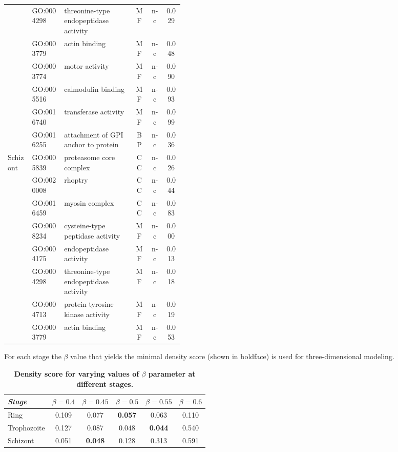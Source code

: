 \begin{table}
\begin{center}
\begin{tabular}{llp{0.4\linewidth}ccc}
& GO:0004298 & threonine-type endopeptidase activity & MF  & n-c & 0.029\\
& GO:0003779 & actin binding & MF  & n-c & 0.048\\
& GO:0003774 & motor activity & MF  & n-c & 0.090\\
& GO:0005516 & calmodulin binding & MF  & n-c & 0.093\\
& GO:0016740 & transferase activity & MF  & n-c & 0.099\\
& GO:0016255 & attachment of GPI anchor to protein & BP & n-c & 0.036\\
\hline
\multirow{8}{*}{Schizont}
& GO:0005839 & proteasome core complex & CC & n-c & 0.026\\
& GO:0020008 & rhoptry & CC & n-c & 0.044\\
& GO:0016459 & myosin complex & CC & n-c & 0.083\\
& GO:0008234 & cysteine-type peptidase activity & MF  & n-c & 0.000\\
& GO:0004175 & endopeptidase activity & MF  & n-c & 0.013\\
& GO:0004298 & threonine-type endopeptidase activity & MF  & n-c & 0.018\\
& GO:0004713 & protein tyrosine kinase activity & MF  & n-c & 0.019\\
& GO:0003779 & actin binding & MF  & n-c & 0.053\\
\hline
\end{tabular}
\end{center}
\label{table:secondPro}
\end{table}
\clearpage

\begin{table}
\caption{{\bf Density score for varying values of $\beta$ parameter at different stages.}}
{For each stage the $\beta$ value that yields the minimal density score (shown in boldface)
is used for three-dimensional modeling.}
\vspace{10pt}
\begin{center}
\begin{tabular}{lccccc}
\hline
\emph{Stage} & $\beta = 0.4$ & $\beta = 0.45$ & $\beta = 0.5$ & $\beta = 0.55$ &
$\beta = 0.6$ \\
\hline
Ring & 0.109 & 0.077 & \textbf{0.057} & 0.063 & 0.110 \\
Trophozoite & 0.127 & 0.087 & 0.048 & \textbf{0.044} & 0.540 \\
Schizont & 0.051 & \textbf{0.048} & 0.128 & 0.313 & 0.591 \\\hline
\end{tabular}
\end{center}
\label{table:density}
\end{table}
\clearpage




